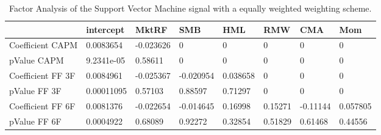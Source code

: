 \begin{table}[H]
\centering
\begin{tabular}{llllllll}
& intercept & MktRF & SMB & HML & RMW & CMA & Mom \\ 
\hline 
Coefficient CAPM & 0.0083654 & -0.023626 & 0 & 0 & 0 & 0 & 0 \\ 
pValue CAPM & 9.2341e-05 & 0.58611 & 0 & 0 & 0 & 0 & 0 \\ 
Coefficient FF 3F & 0.0084961 & -0.025367 & -0.020954 & 0.038658 & 0 & 0 & 0 \\ 
pValue FF 3F & 0.00011095 & 0.57103 & 0.88597 & 0.71297 & 0 & 0 & 0 \\ 
Coefficient FF 6F & 0.0081376 & -0.022654 & -0.014645 & 0.16998 & 0.15271 & -0.11144 & 0.057805 \\ 
pValue FF 6F & 0.0004922 & 0.68089 & 0.92272 & 0.32854 & 0.51829 & 0.61468 & 0.44556 \\ 
\hline
\end{tabular}
\caption{Factor Analysis of the Support Vector Machine signal with a equally weighted weighting scheme.}
\label{SVM_MODEL_EW_FACTOR}
\end{table}